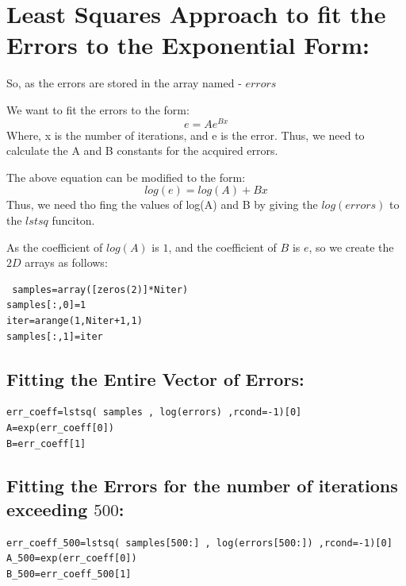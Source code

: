 \documentclass[10pt,english, openany]{book}
\begin{document}
\section{Least Squares Approach to fit the Errors to the Exponential Form:}
So, as the errors are stored in the array named - $errors$

 We want to fit the errors to the form:
 \begin{equation*}
 e=Ae^{Bx}
 \end{equation*}
 Where, x is the number of iterations, and e is the error. Thus, we need to calculate the A and B constants for the acquired errors.\par
 The above equation can be modified to the form:
 \begin{equation*}
 log(e) = log(A) +Bx
 \end{equation*}
 Thus, we need tho fing the values of log(A) and B by giving the $log(errors)$ to the $lstsq$ funciton.\par
 As the coefficient of $log(A)$ is $1$, and the coefficient of $B$ is $e$, so we create the $2D$ arrays as follows:
 \begin{verbatim}
 samples=array([zeros(2)]*Niter)
samples[:,0]=1
iter=arange(1,Niter+1,1)
samples[:,1]=iter
 \end{verbatim}
 
 
 \subsection{Fitting the Entire Vector of Errors:}

\begin{verbatim}
err_coeff=lstsq( samples , log(errors) ,rcond=-1)[0]
A=exp(err_coeff[0])
B=err_coeff[1]
\end{verbatim}


 \subsection{Fitting the Errors for the number of iterations exceeding $500$:}

\begin{verbatim}
err_coeff_500=lstsq( samples[500:] , log(errors[500:]) ,rcond=-1)[0]
A_500=exp(err_coeff[0])
B_500=err_coeff_500[1]
\end{verbatim}

    
\end{document}
